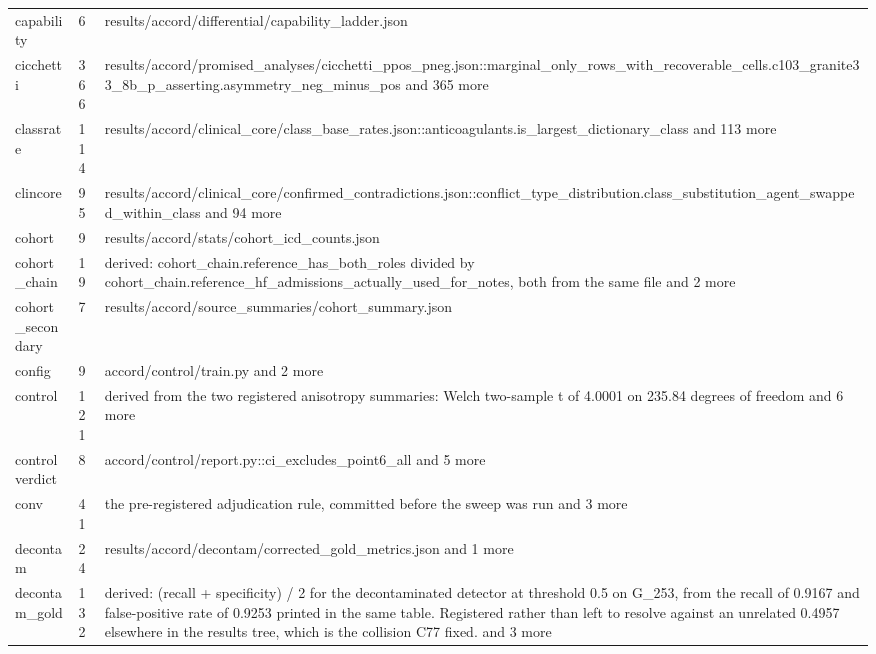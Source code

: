 \begin{longtable}{@{}p{1.6in}p{0.6in}p{3.6in}@{}}
capability & 6 & results/\allowbreak{}accord/\allowbreak{}differential/\allowbreak{}capability\_ladder.\allowbreak{}json\\
cicchetti & 366 & results/\allowbreak{}accord/\allowbreak{}promised\_analyses/\allowbreak{}cicchetti\_ppos\_pneg.\allowbreak{}json::marginal\_only\_rows\_with\_recoverable\_cells.\allowbreak{}c103\_granite33\_8b\_p\_asserting.\allowbreak{}asymmetry\_neg\_minus\_pos and 365 more\\
classrate & 114 & results/\allowbreak{}accord/\allowbreak{}clinical\_core/\allowbreak{}class\_base\_rates.\allowbreak{}json::anticoagulants.\allowbreak{}is\_largest\_dictionary\_class and 113 more\\
clincore & 95 & results/\allowbreak{}accord/\allowbreak{}clinical\_core/\allowbreak{}confirmed\_contradictions.\allowbreak{}json::conflict\_type\_distribution.\allowbreak{}class\_substitution\_agent\_swapped\_within\_class and 94 more\\
cohort & 9 & results/\allowbreak{}accord/\allowbreak{}stats/\allowbreak{}cohort\_icd\_counts.\allowbreak{}json\\
cohort\_chain & 19 & derived: cohort\_chain.\allowbreak{}reference\_has\_both\_roles divided by cohort\_chain.\allowbreak{}reference\_hf\_admissions\_actually\_used\_for\_notes, both from the same file and 2 more\\
cohort\_secondary & 7 & results/\allowbreak{}accord/\allowbreak{}source\_summaries/\allowbreak{}cohort\_summary.\allowbreak{}json\\
config & 9 & accord/\allowbreak{}control/\allowbreak{}train.\allowbreak{}py and 2 more\\
control & 121 & derived from the two registered anisotropy summaries: Welch two-sample t of 4.\allowbreak{}0001 on 235.\allowbreak{}84 degrees of freedom and 6 more\\
controlverdict & 8 & accord/\allowbreak{}control/\allowbreak{}report.\allowbreak{}py::ci\_excludes\_point6\_all and 5 more\\
conv & 41 & the pre-registered adjudication rule, committed before the sweep was run and 3 more\\
decontam & 24 & results/\allowbreak{}accord/\allowbreak{}decontam/\allowbreak{}corrected\_gold\_metrics.\allowbreak{}json and 1 more\\
decontam\_gold & 132 & derived: (recall + specificity) /\allowbreak{} 2 for the decontaminated detector at threshold 0.\allowbreak{}5 on G\_253, from the recall of 0.\allowbreak{}9167 and false-positive rate of 0.\allowbreak{}9253 printed in the same table.\allowbreak{} Registered rather than left to resolve against an unrelated 0.\allowbreak{}4957 elsewhere in the results tree, which is the collision C77 fixed.\allowbreak{} and 3 more\\

\end{longtable}
